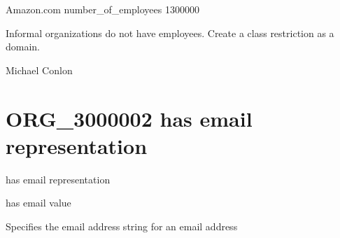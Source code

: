 \documentclass[letterpaper,10pt,english]{sphinxmanual}
\begin{document}
\begin{sphinxShadowBox}

\sphinxAtStartPar
Amazon.com number\_of\_employees 1300000
\end{sphinxShadowBox}

\begin{sphinxShadowBox}

\sphinxAtStartPar
Informal organizations do not have employees.  Create a class restriction as a domain.
\end{sphinxShadowBox}

\begin{sphinxShadowBox}

\sphinxAtStartPar
Michael Conlon 
\end{sphinxShadowBox}
\begin{quote}
\label{\detokenize{doc-ORG_3000002:org-3000002}}\label{\detokenize{doc-ORG_3000002:has-email-representation}}\label{\detokenize{doc-ORG_3000002:org-3000002}}
\ignorespaces \end{quote}


\section{ORG\_3000002 \sphinxhyphen{} has email representation}
\label{\detokenize{doc-ORG_3000002:org-3000002-has-email-representation}}\label{\detokenize{doc-ORG_3000002:index-0}}\label{\detokenize{doc-ORG_3000002::doc}}
\begin{sphinxShadowBox}

\sphinxAtStartPar
has email representation
\end{sphinxShadowBox}

\begin{sphinxShadowBox}

\sphinxAtStartPar
has email value
\end{sphinxShadowBox}

\begin{sphinxShadowBox}

\sphinxAtStartPar
Specifies the email address string for an email address
\end{sphinxShadowBox}
\end{document}
